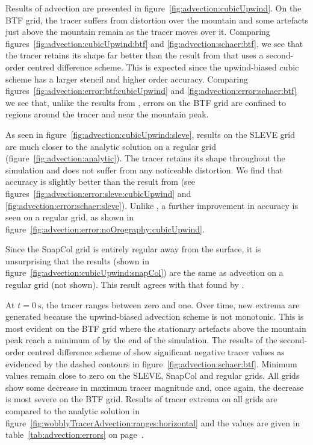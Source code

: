Results of advection are presented in figure~\ref{fig:advection:cubicUpwind}.
On the BTF grid, the tracer suffers from distortion over the mountain and some artefacts just above the mountain remain as the tracer moves over it.  Comparing figures~\ref{fig:advection:cubicUpwind:btf} and \ref{fig:advection:schaer:btf}, we see that the tracer retains its shape far better than the result from \textcite{schaer2002} that uses a second-order centred difference scheme.  This is expected since the upwind-biased cubic scheme has a larger stencil and higher order accuracy.  Comparing figures~\ref{fig:advection:error:btf:cubicUpwind} and \ref{fig:advection:error:schaer:btf} we see that, unlike the results from \textcite{schaer2002}, errors on the BTF grid are confined to regions around the tracer and near the mountain peak.

As seen in figure~\ref{fig:advection:cubicUpwind:sleve}, results on the SLEVE grid are much closer to the analytic solution on a regular grid (figure~\ref{fig:advection:analytic}).  The tracer retains its shape throughout the simulation and does not suffer from any noticeable distortion.  We find that accuracy is slightly better than the result from \textcite{schaer2002} (see figures~\ref{fig:advection:error:sleve:cubicUpwind} and \ref{fig:advection:error:schaer:sleve}).  Unlike \textcite{schaer2002}, a further improvement in accuracy is seen on a regular grid, as shown in figure~\ref{fig:advection:error:noOrography:cubicUpwind}.

Since the SnapCol grid is entirely regular away from the surface, it is unsurprising that the results (shown in figure~\ref{fig:advection:cubicUpwind:snapCol}) are the same as advection on a regular grid (not shown).  This result agrees with that found by \textcite{good2013}.

At $t = \SI{0}{\second}$, the tracer ranges between zero and one.  Over time, new extrema are generated because the upwind-biased advection scheme is not monotonic.  This is most evident on the BTF grid where the stationary artefacts above the mountain peak reach a minimum of  by the end of the simulation.  The results of the second-order centred difference scheme of \textcite{schaer2002} show significant negative tracer values as evidenced by the dashed contours in figure~\ref{fig:advection:schaer:btf}.  Minimum values remain close to zero on the SLEVE, SnapCol and regular grids.  All grids show some decrease in maximum tracer magnitude and, once again, the decrease is most severe on the BTF grid.  Results of tracer extrema on all grids are compared to the analytic solution in figure~\ref{fig:wobblyTracerAdvection:ranges:horizontal} and the values are given in table~\ref{tab:advection:errors} on page~\pageref{tab:advection:errors}.

